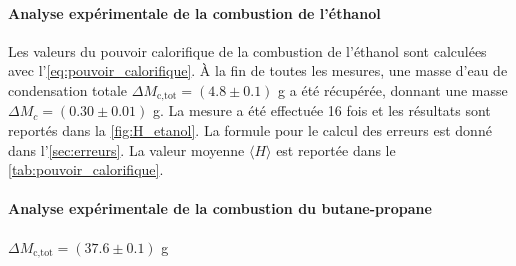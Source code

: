 \paragraph*{Analyse expérimentale de la combustion de l'éthanol}
Les valeurs du pouvoir calorifique de la combustion de l'éthanol sont calculées avec l'\autoref{eq:pouvoir_calorifique}. À la fin de toutes les mesures, une masse d'eau de condensation totale \(\Delta M_\textrm{c,tot} = (4.8 \pm 0.1)\) \si{\gram} a été récupérée, donnant une masse \(\Delta M_c = (0.30 \pm 0.01)\) \si{\gram}. La mesure a été effectuée 16 fois et les résultats sont reportés dans la \autoref{fig:H_etanol}. La formule pour le calcul des erreurs est donné dans l'\autoref{sec:erreurs}. La valeur moyenne \(\langle H \rangle\) est reportée dans le \autoref{tab:pouvoir_calorifique}.

\paragraph*{Analyse expérimentale de la combustion du butane-propane}

\(\Delta M_\textrm{c,tot} = (37.6 \pm 0.1)\) \si{\gram}

